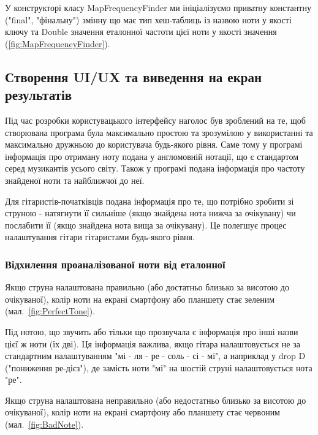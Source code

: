 У конструкторі класу MapFrequencyFinder ми ініціалізуємо приватну константну ("final", "фінальну") змінну що має тип хеш-таблиць із назвою ноти у якості ключу та Double значення еталонної частоти цієї ноти у якості значення (\ref{fig:MapFrequencyFinder}).



\subsection{Створення UI/UX та виведення на екран результатів}

Під час розробки користувацького інтерфейсу наголос був зроблений на те, щоб створювана програма була максимально простою та зрозумілою у використанні та максимально дружньою до користувача будь-якого рівня. Саме тому у програмі інформація про отриману ноту подана у англомовній нотації, що є стандартом серед музикантів усього світу. Також у програмі подана інформація про частоту знайденої ноти та найближчої до неї.

Для гітаристів-початківців подана інформація про те, що потрібно зробити зі струною - натягнути її сильніше (якщо знайдена нота нижча за очікувану) чи послабити її (якщо знайдена нота вища за очікувану). Це полегшує процес налаштування гітари гітаристами будь-якого рівня.



\subsubsection{Відхилення проаналізованої ноти від еталонної}


Якщо струна налаштована правильно (або достатньо близько за висотою до очікуваної), колір ноти на екрані смартфону або планшету стає зеленим (мал.~\ref{fig:PerfectTone}). 

Під нотою, що звучить або тільки що прозвучала є інформація про інші назви цієї ж ноти (їх дві). Ця інформація важлива, якщо гітара налаштовується не за стандартним налаштуванням "мі - ля - ре - соль - сі - мі", а наприклад у drop D ("пониження ре-дієз"), де замість ноти "мі" на шостій струні налаштовується нота "ре".

Якщо струна налаштована неправильно (або недостатньо близько за висотою до очікуваної), колір ноти на екрані смартфону або планшету стає червоним (мал.~\ref{fig:BadNote}).

